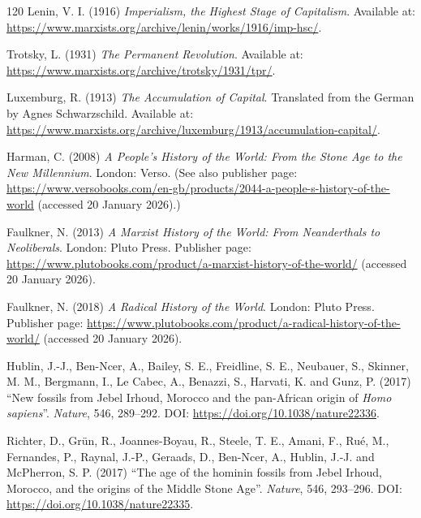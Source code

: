 \begin{singlespace}
\begin{thebibliography}{120}
Lenin, V. I. (1916) \emph{Imperialism, the Highest Stage of Capitalism}.
Available at: \url{https://www.marxists.org/archive/lenin/works/1916/imp-hsc/}.

Trotsky, L. (1931) \emph{The Permanent Revolution}.
Available at: \url{https://www.marxists.org/archive/trotsky/1931/tpr/}.

Luxemburg, R. (1913) \emph{The Accumulation of Capital}.
Translated from the German by Agnes Schwarzschild.
Available at: \url{https://www.marxists.org/archive/luxemburg/1913/accumulation-capital/}.


Harman, C. (2008) \emph{A People's History of the World: From the Stone Age to the New Millennium}.
London: Verso.
(See also publisher page: \url{https://www.versobooks.com/en-gb/products/2044-a-people-s-history-of-the-world} (accessed 20 January 2026).)

Faulkner, N. (2013) \emph{A Marxist History of the World: From Neanderthals to Neoliberals}.
London: Pluto Press.
Publisher page: \url{https://www.plutobooks.com/product/a-marxist-history-of-the-world/} (accessed 20 January 2026).

Faulkner, N. (2018) \emph{A Radical History of the World}.
London: Pluto Press.
Publisher page: \url{https://www.plutobooks.com/product/a-radical-history-of-the-world/} (accessed 20 January 2026).


Hublin, J.-J., Ben-Ncer, A., Bailey, S. E., Freidline, S. E., Neubauer, S., Skinner, M. M., Bergmann, I., Le Cabec, A., Benazzi, S., Harvati, K. and Gunz, P. (2017)
``New fossils from Jebel Irhoud, Morocco and the pan-African origin of \emph{Homo sapiens}''.
\emph{Nature}, 546, 289--292.
DOI: \url{https://doi.org/10.1038/nature22336}.

Richter, D., Gr\"un, R., Joannes-Boyau, R., Steele, T. E., Amani, F., Ru\'e, M., Fernandes, P., Raynal, J.-P., Geraads, D., Ben-Ncer, A., Hublin, J.-J. and McPherron, S. P. (2017)
``The age of the hominin fossils from Jebel Irhoud, Morocco, and the origins of the Middle Stone Age''.
\emph{Nature}, 546, 293--296.
DOI: \url{https://doi.org/10.1038/nature22335}.


\end{thebibliography}
\end{singlespace}
